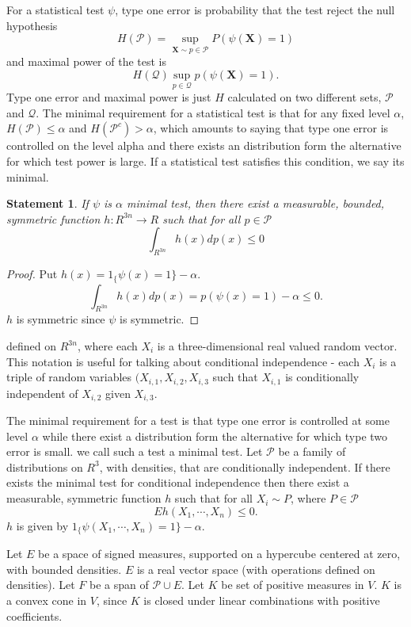 \documentclass{article}
\newtheorem{statement}{Statement}
\begin{document}
For a statistical test $\psi$, type one error is probability that the test reject the null hypothesis 
\[
 H(\mathcal{P}) =  \sup_{\mathbf{X} \sim p \in \mathcal{P} }   P( \psi(\mathbf X) =1 )
\]
and maximal power of the test is 
\[
H(\mathcal{Q}) \sup_{p \in \mathcal{Q} }   p( \psi(\mathbf X) =1 ).
\]
 Type one error and maximal power is just $H$  calculated on two different sets,  $\mathcal{P}$ and $\mathcal{Q}$. The minimal requirement for a statistical test is that for any fixed level $\alpha$, $H(\mathcal{P}) \leq \alpha$ and $H(\mathcal{P}^c) > \alpha$, which amounts to saying that type one error is controlled on the level alpha and there exists an distribution form the alternative for which test power is large. If a statistical test satisfies this condition, we say its minimal. 

\begin{statement}
If $\psi$ is $\alpha$ minimal test, then there exist a measurable, bounded, symmetric function $h: R^{3n} \to R$ such that for all $p \in \mathcal{P}$ 
\[
 \int_{R^{3n}} h(x) dp(x)  \leq 0
\]
\end{statement}

\begin{proof}
 Put $h(x) = 1_\{ \psi(x) =1 \} - \alpha$. 
 \[
  \int_{R^{3n}} h(x) dp(x) = p( \psi(x) =1) - \alpha \leq 0.
 \]
$h$ is symmetric since $\psi$ is symmetric. 
\end{proof}



defined on  $R^{3n}$, where each $X_i$ is a three-dimensional real valued random vector. This notation is useful for talking about conditional independence - each $X_i$ is a triple of random variables $(X_{i,1},X_{i,2},X_{i,3}$ such that $X_{i,1}$ is conditionally independent of $X_{i,2}$ given $X_{i,3}$.


The minimal requirement for a test is that type one error is controlled at some level $\alpha$ while there exist a distribution form the alternative for which type two error is small. we call such a test a minimal test.  Let $\mathcal P$ be a family of distributions on $R^3$, with densities, that are conditionally independent. If there exists the minimal test for conditional independence then there exist a measurable, symmetric function $h$ such that for all $X_i \sim P$, where $P \in \mathcal P$
\[
 E h(X_1, \cdots , X_n) \leq 0.
\]
$h$ is given by $1_\{ \psi(X_1, \cdots, X_n) =1 \} - \alpha$.  

Let $E$ be a space of signed measures, supported on a hypercube centered at zero, with bounded densities. $E$ is a real vector space (with operations defined on densities). Let $F$ be a span of $\mathcal P \cup E$. Let $K$ be set of positive measures in $V$. $K$ is a convex cone in $V$, since $K$ is closed under linear combinations with positive coefficients.
\end{document}
